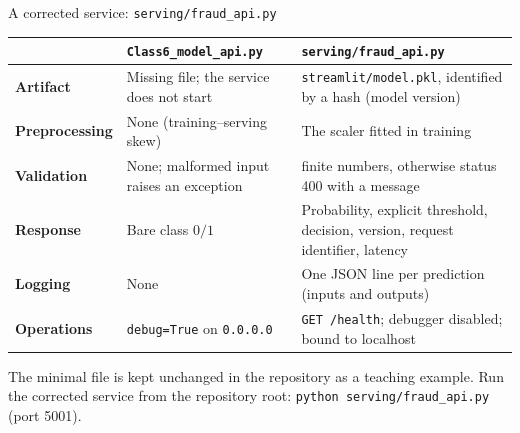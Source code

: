 \begin{frame}{A corrected service: \texttt{serving/fraud\_api.py}}
\begingroup\footnotesize
\renewcommand{\arraystretch}{1.25}
\begin{tabularx}{\textwidth}{>{\bfseries}l >{\raggedright\arraybackslash}X >{\raggedright\arraybackslash}X}
& \bfseries \texttt{Class6\_model\_api.py} & \bfseries \texttt{serving/fraud\_api.py} \\
\toprule
Artifact & Missing file; the service does not start & \texttt{streamlit/model.pkl}, identified by a hash (model version) \\
Preprocessing & None (training--serving skew) & The scaler fitted in training \\
Validation & None; malformed input raises an exception & 30 finite numbers, otherwise status 400 with a message \\
Response & Bare class $0/1$ & Probability, explicit threshold, decision, version, request identifier, latency \\
Logging & None & One JSON line per prediction (inputs and outputs) \\
Operations & \texttt{debug=True} on \texttt{0.0.0.0} & \texttt{GET /health}; debugger disabled; bound to localhost \\
\bottomrule
\end{tabularx}
\par\endgroup
\vspace{0.4em}
{\scriptsize The minimal file is kept unchanged in the repository as a teaching example. Run the corrected service from the repository root: \texttt{python serving/fraud\_api.py} (port 5001).\par}
\coursefooter
\end{frame}

